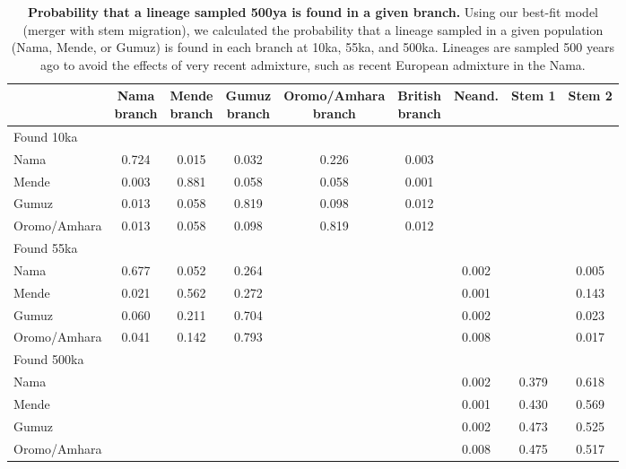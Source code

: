 \documentclass[]{article}
\begin{document}
\begin{table}[ht]
\caption{
    \label{tab:supp-lineage-probabilitys}
    \textbf{Probability that a lineage sampled 500ya is found in a given branch.}
    Using our best-fit model (merger with stem migration), we calculated the probability
    that a lineage sampled in a given population (Nama, Mende, or Gumuz) is found in
    each branch at 10ka, 55ka, and 500ka. Lineages are sampled 500 years ago to
    avoid the effects of very recent admixture, such as recent European admixture in
    the Nama.
}
\centering
\begin{tabular}[t]{lcccccccc}
    \toprule
    & \specialcell{Nama\\branch} & \specialcell{Mende\\branch} &
    \specialcell{Gumuz\\branch} & \specialcell{Oromo/Amhara\\branch} & 
    \specialcell{British\\branch} & Neand. & Stem 1 & Stem 2\\
    \midrule
    Found 10ka & & & & & & & \\
    Nama & 0.724 & 0.015 & 0.032 & 0.226 & 0.003 & & & \\
    Mende & 0.003 & 0.881 & 0.058 & 0.058 & 0.001 & & & \\
    Gumuz & 0.013 & 0.058 & 0.819 & 0.098 & 0.012 & & & \\
    Oromo/Amhara & 0.013 & 0.058 & 0.098 & 0.819 & 0.012 & & & \\
    \midrule
    Found 55ka & & & & & & & \\
    Nama & 0.677 & 0.052 & 0.264 & & & 0.002 & & 0.005 \\
    Mende & 0.021 & 0.562 & 0.272 & & & 0.001 & & 0.143 \\
    Gumuz & 0.060 & 0.211 & 0.704 & & & 0.002 & & 0.023 \\
    Oromo/Amhara & 0.041 & 0.142 & 0.793 & & & 0.008 & & 0.017 \\
    \midrule
    Found 500ka & & & & & & & & \\
    Nama & & & & & & 0.002 & 0.379 & 0.618 \\
    Mende & & & & & & 0.001 & 0.430 & 0.569 \\
    Gumuz  & & & & & & 0.002 & 0.473 & 0.525 \\
    Oromo/Amhara & & & & & & 0.008 & 0.475 & 0.517 \\
    \bottomrule
\end{tabular}
\end{table}
\end{document}
